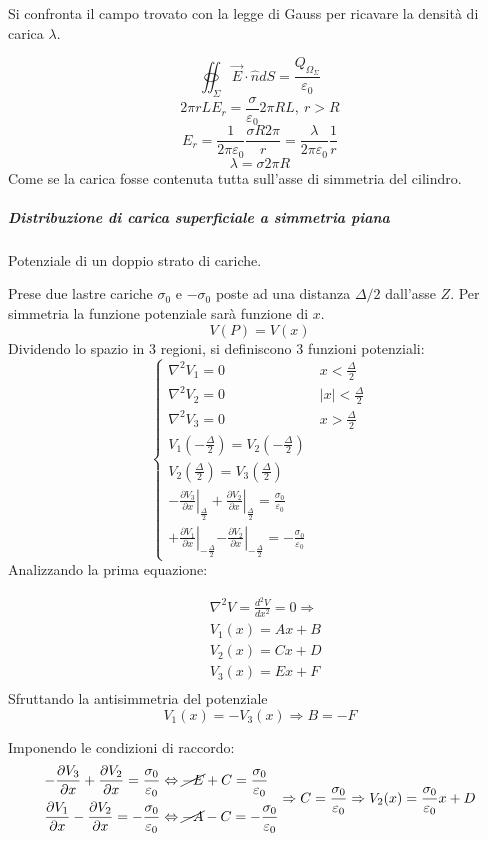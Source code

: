 Si confronta il campo trovato con la legge di Gauss per ricavare la densità di carica $\lambda$.

$$
\oiint_\Sigma \vec{E}\cdot\hat{n}dS = \frac{Q_{\Omega_\Sigma}}{\varepsilon_0}
$$
$$
2 \pi r L E_r = \frac{\sigma}{\varepsilon_0} 2 \pi R L,\ r > R
$$
$$
E_r = \frac{1}{2 \pi \varepsilon_0} \frac{\sigma R 2 \pi}{r} = \frac{\lambda}{2\pi\varepsilon_0}\frac{1}{r}
$$
$$
\lambda = \sigma 2 \pi R
$$
Come se la carica fosse contenuta tutta sull'asse di simmetria del cilindro.


\subparagraph{Distribuzione di carica superficiale a simmetria piana}
Potenziale di un doppio strato di cariche.

Prese due lastre cariche $\sigma_0$ e $-\sigma_0$ poste ad una distanza $\Delta/2$ dall'asse $Z$.
Per simmetria la funzione potenziale sarà funzione di $x$.
$$
V(P) = V(x)
$$
Dividendo lo spazio in 3 regioni, si definiscono 3 funzioni potenziali:
$$
\begin{cases}
\nabla^2V_1 = 0 &x < \frac{\Delta}{2}\\
\nabla^2V_2 = 0 & |x| < \frac{\Delta}{2}\\
\nabla^2V_3 = 0 & x > \frac{\Delta}{2}\\
V_1(-\frac{\Delta}{2}) = V_2(-\frac{\Delta}{2}) \\
V_2(\frac{\Delta}{2}) = V_3(\frac{\Delta}{2}) \\
-\left.\frac{\partial V_3}{\partial x}\right|_{\frac{\Delta}{2}} + \left. \frac{\partial V_2}{\partial x}\right|_{\frac{\Delta}{2}} = \frac{\sigma_0}{\varepsilon_0} \\
+\left. \frac{\partial V_1}{\partial x}\right|_{-\frac{\Delta}{2}}  \left.-\frac{\partial V_2}{\partial x}\right|_{-\frac{\Delta}{2}} = -\frac{\sigma_0}{\varepsilon_0}\
\end{cases}
$$
Analizzando la prima equazione:

\begin{align*}
&\nabla^2V = \frac{d^2V}{dx^2} = 0 \Rightarrow \\
&V_1(x) = Ax+B \\
&V_2(x) = Cx+D \\
&V_3(x) = Ex + F \\
\end{align*}
Sfruttando la antisimmetria del potenziale
$$
V_1(x) = - V_3(x) \Rightarrow B = -F
$$

Imponendo le condizioni di raccordo:
$$
\begin{aligned}
-\frac{\partial V_3}{\partial x} + \frac{\partial V_2}{\partial x} = \frac{\sigma_0}{\varepsilon_0} 
&\Leftrightarrow \cancel{-E} + C = \frac{\sigma_0}{\varepsilon_0}\\
\frac{\partial V_1}{\partial x} - \frac{\partial V_2}{\partial x} = -\frac{\sigma_0}{\varepsilon_0}
&\Leftrightarrow \cancel{-A} - C = -\frac{\sigma_0}{\varepsilon_0}
\end{aligned} \Rightarrow C = \frac{\sigma_0}{\varepsilon_0} \Rightarrow V_2(x) = \frac{\sigma_0}{\varepsilon_0}x + D
$$

